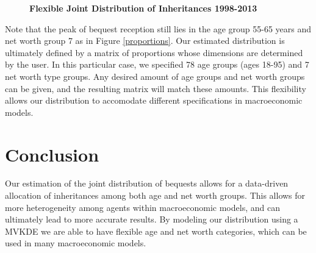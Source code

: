 \documentclass[letterpaper,12pt]{article}
\theoremstyle{definition}
\begin{document}
\begin{spacing}{1.5}
    \begin{figure}[htbp]\centering \captionsetup{width=6.0in}
      \caption{\label{MVKDE}\textbf{Flexible Joint Distribution of Inheritances 1998-2013}}
    \end{figure}

    \newpage Note that the peak of bequest reception still lies in the age group 55-65 years and net worth group 7 as in Figure \ref{proportions}. Our estimated distribution is ultimately defined by a matrix of proportions whose dimensions are determined by the user. In this particular case, we specified 78 age groups (ages 18-95) and 7 net worth type groups. Any desired amount of age groups and net worth groups can be given, and the resulting matrix will match these amounts. This flexibility allows our distribution to accomodate different specifications in macroeconomic models.

    


\section{Conclusion}\label{SecConclusion}

  Our estimation of the joint distribution of bequests allows for a data-driven allocation of inheritances among both age and net worth groups. This allows for more heterogeneity among agents within macroeconomic models, and can ultimately lead to more accurate results. By modeling our distribution using a MVKDE we are able to have flexible age and net worth categories, which can be used in many macroeconomic models.


\end{spacing}
\end{document}
